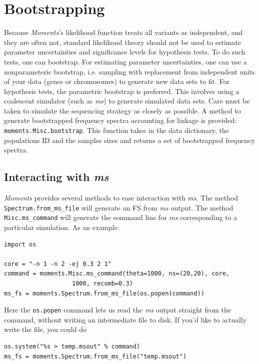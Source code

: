 \documentclass[12pt]{article}
\makeatletter
\newcommand{\ms}{\emph{ms}\xspace}
\newcommand{\py}[1]{\lstinline[breaklines=true,language=Python, showstringspaces=False]@#1@}
\makeatother
\begin{document}
\section{Bootstrapping}

Because \textit{Moments}'s likelihood function treats all variants as independent, and they are often not, standard likelihood theory should not be used to estimate parameter uncertainties and significance levels for hypothesis tests.
To do such tests, one can bootstrap.
For estimating parameter uncertainties, one can use a nonparameteric bootstrap, i.e. sampling with replacement from independent units of your data (genes or chromosomes) to generate new data sets to fit.
For hypothesis tests, the parametric bootstrap is preferred.
This involves using a coalescent simulator (such as \ms) to generate simulated data sets.
Care must be taken to simulate the sequencing strategy as closely as possible.
A method to generate bootstrapped frequency spectra accounting for linkage is provided: \py{moments.Misc.bootstrap}. This function takes in the data dictionary, the populations ID and the samples sizes and returns a set of bootstrapped frequency spectra.

\subsection{Interacting with \ms}

\textit{Moments} provides several methods to ease interaction with \ms.
The method \py{Spectrum.from_ms_file} will generate an FS from \ms output.
The method \py{Misc.ms_command} will generate the command line for \ms corresponding to a particular simulation.
As an example:
\begin{lstlisting}
import os

core = "-n 1 -n 2 -ej 0.3 2 1"
command = moments.Misc.ms_command(theta=1000, ns=(20,20), core, 
				   1000, recomb=0.3)
ms_fs = moments.Spectrum.from_ms_file(os.popen(command))
\end{lstlisting}
Here the \py{os.popen} command lets us read the \ms output straight from the command, without writing an intermediate file to disk.
If you'd like to actually write the file, you could do
\begin{lstlisting}
os.system("%s > temp.msout" % command)
ms_fs = moments.Spectrum.from_ms_file("temp.msout")
\end{lstlisting}
\end{document}
